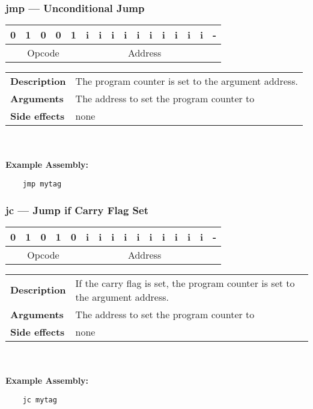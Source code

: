 \documentclass[titlepage]{article}
\begin{document}
\subsubsection{jmp --- Unconditional Jump}\begin{center}
\begin{tabular}{|c|c|c|c|c|c|c|c|c|c|c|c|c|c|c|c|}
\hline
0 & 1 & 0 & 0 & 1 & i & i & i & i & i & i & i & i & i & i & - \\
\hline
\multicolumn{5}{|c}{Opcode} &
\multicolumn{10}{|c}{Address} &
\multicolumn{1}{|c|}{} \\
\hline
\end{tabular}
\end{center}

\begin{tabular}{l p{8cm}}
{\bf Description} & The program counter is set to the argument address. \\
{\bf Arguments} & The address to set the program counter to \\
{\bf Side effects} & none \\
\end{tabular}\\ \\
{\bf Example Assembly:}
\begin{verbatim}
    jmp mytag
\end{verbatim}

\subsubsection{jc --- Jump if Carry Flag Set}\begin{center}
\begin{tabular}{|c|c|c|c|c|c|c|c|c|c|c|c|c|c|c|c|}
\hline
0 & 1 & 0 & 1 & 0 & i & i & i & i & i & i & i & i & i & i & - \\
\hline
\multicolumn{5}{|c}{Opcode} &
\multicolumn{10}{|c}{Address} &
\multicolumn{1}{|c|}{} \\
\hline
\end{tabular}
\end{center}

\begin{tabular}{l p{8cm}}
{\bf Description} & If the carry flag is set, the program counter is set to the argument address. \\
{\bf Arguments} & The address to set the program counter to \\
{\bf Side effects} & none \\
\end{tabular}\\ \\
{\bf Example Assembly:}
\begin{verbatim}
    jc mytag
\end{verbatim}
\end{document}

